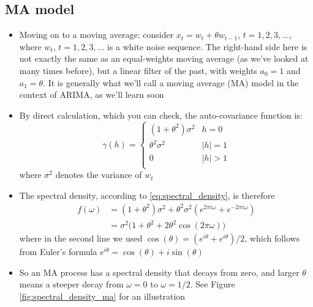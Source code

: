 \documentclass{article}
\begin{document}
\subsection{MA model}

\begin{itemize}
\item Moving on to a moving average: consider $x_t = w_t + \theta w_{t-1}$, $t =
  1,2,3,\dots$, where $w_t$, $t = 1,2,3,\dots$ is a white noise sequence. The
  right-hand side here is not exactly the same as an equal-weights moving
  average (as we've looked at many times before), but a linear filter of the
  past, with weights $a_0 = 1$ and $a_1 = \theta$. It is generally what we'll
  call a moving average (MA) model in the context of ARIMA, as we'll learn soon  

\item By direct calculation, which you can check, the auto-covariance function
  is: 
  \[
  \gamma(h) = \begin{cases}
  (1+\theta^2) \sigma^2 & h = 0 \\
  \theta^2 \sigma^2 & |h| = 1 \\
  0 & |h| > 1 \\
  \end{cases}
  \]
  where $\sigma^2$ denotes the variance of $w_t$

\item The spectral density, according to \eqref{eq:spectral_density}, is
  therefore
  \begin{align*}
  f(\omega) &= (1+\theta^2) \sigma^2 + \theta^2 \sigma^2 (e^{2\pi i \omega} +
              e^{-2\pi i \omega}) \\
  &=  \sigma^2 \Big( 1+\theta^2 + 2 \theta^2 \cos(2\pi \omega) \Big)
  \end{align*}
  where in the second line we used $\cos(\theta) = (e^{i\theta} +e^{i\theta}) / 
  2$, which follows from Euler's formula $e^{i\theta} = \cos(\theta) + i
  \sin(\theta)$

\item So an MA process has a spectral density that decays from zero, and larger
  $\theta$ means a steeper decay from $\omega = 0$ to $\omega = 1/2$. See Figure
  \ref{fig:spectral_density_ma} for an illustration  


\end{itemize}
\end{document}
